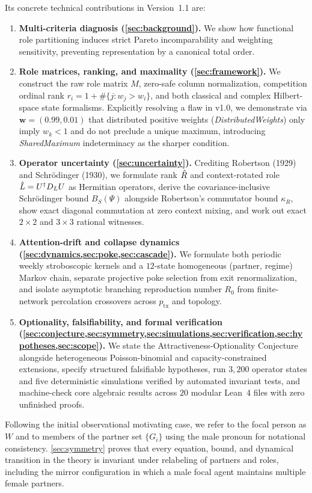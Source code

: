 Its concrete technical contributions in Version~1.1 are:
\begin{enumerate}[nosep]
  \item \textbf{Multi-criteria diagnosis (\cref{sec:background}).} We show how
        functional role partitioning induces strict Pareto incomparability and
        weighting sensitivity, preventing representation by a canonical total order.
  \item \textbf{Role matrices, ranking, and maximality (\cref{sec:framework}).} We
        construct the raw role matrix $M$, zero-safe column normalization, competition
        ordinal rank $r_i = 1 + \#\{j : w_j > w_i\}$, and both classical and complex
        Hilbert-space state formalisms. Explicitly resolving a flaw in v1.0, we
        demonstrate via $\mathbf{w} = (0.99, 0.01)$ that distributed positive weights
        (\emph{DistributedWeights}) only imply $w_k < 1$ and do not preclude a unique
        maximum, introducing \emph{SharedMaximum} indeterminacy as the sharper condition.
  \item \textbf{Operator uncertainty (\cref{sec:uncertainty}).} Crediting Robertson
        (1929) and Schr\"odinger (1930), we formulate rank $\hat{R}$ and context-rotated
        role $\hat{L} = U^\dagger D_L U$ as Hermitian operators, derive the covariance-inclusive
        Schr\"odinger bound $B_S(\Psi)$ alongside Robertson's commutator bound $\kappa_R$,
        show exact diagonal commutation at zero context mixing, and work out exact
        $2\times 2$ and $3\times 3$ rational witnesses.
  \item \textbf{Attention-drift and collapse dynamics (\cref{sec:dynamics,sec:poke,sec:cascade}).}
        We formulate both periodic weekly stroboscopic kernels and a $12$-state
        homogeneous (partner, regime) Markov chain, separate projective poke selection
        from exit renormalization, and isolate asymptotic branching reproduction number
        $R_0$ from finite-network percolation crossovers across $p_{\mathrm{tx}}$ and topology.
  \item \textbf{Optionality, falsifiability, and formal verification (\cref{sec:conjecture,sec:symmetry,sec:simulations,sec:verification,sec:hypotheses,sec:scope}).}
        We state the Attractiveness-Optionality Conjecture alongside heterogeneous
        Poisson-binomial and capacity-constrained extensions, specify structured falsifiable
        hypotheses, run $3{,}200$ operator states and five deterministic simulations
        verified by automated invariant tests, and machine-check core algebraic results
        across $20$ modular Lean~4 files with zero unfinished proofs.
\end{enumerate}

\begin{remark}
\label{rem:pronouns}
Following the initial observational motivating case, we refer to the focal person
as $W$ and to members of the partner set $\{G_i\}$ using the male pronoun for
notational consistency. \cref{sec:symmetry} proves that every equation, bound,
and dynamical transition in the theory is invariant under relabeling of partners
and roles, including the mirror configuration in which a male focal agent
maintains multiple female partners.
\end{remark}
